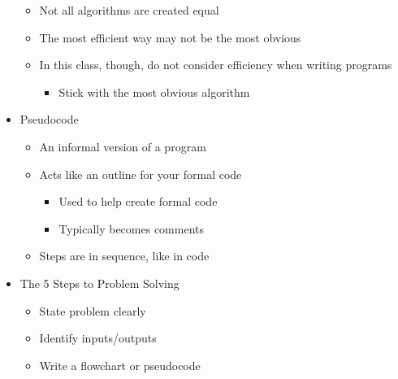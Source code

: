 \begin{itemize}
\begin{itemize}
      \item Not all algorithms are created equal

      \item The most efficient way may not be the most obvious

      \item In this class, though, do not consider efficiency when writing programs

        \begin{itemize}

          \item Stick with the most obvious algorithm

        \end{itemize}

    \end{itemize}

  \item Pseudocode

    \begin{itemize}

      \item An informal version of a program

      \item Acts like an outline for your formal code

        \begin{itemize}

          \item Used to help create formal code

          \item Typically becomes comments

        \end{itemize}

      \item Steps are in sequence, like in code

    \end{itemize}

  \item The 5 Steps to Problem Solving

    \begin{itemize}

      \item State problem clearly

      \item Identify inputs/outputs

      \item Write a flowchart or pseudocode


\end{itemize}
\end{itemize}
